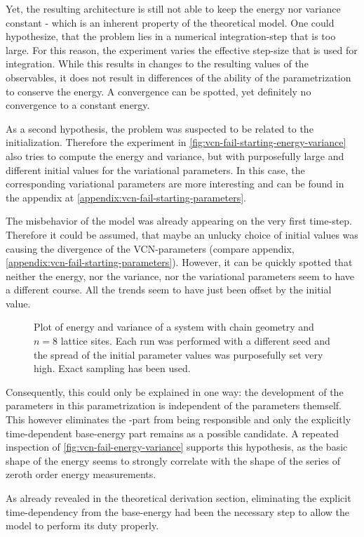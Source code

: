 Yet, the resulting architecture is still not able to keep the energy nor variance constant - which is an inherent property of the theoretical model.
One could hypothesize, that the problem lies in a numerical integration-step that is too large.
For this reason, the experiment varies the effective step-size that is used for integration.
While this results in changes to the resulting values of the observables, it does not result in differences of the ability of the parametrization to conserve the energy.
A convergence can be spotted, yet definitely no convergence to a constant energy.

As a second hypothesis, the problem was suspected to be related to the initialization. 
Therefore the experiment in \autoref{fig:vcn-fail-starting-energy-variance} also tries to compute the energy and variance, but with purposefully large and different initial values for the variational parameters.
In this case, the corresponding variational parameters are more interesting and can be found in the appendix at \ref{appendix:vcn-fail-starting-parameters}.

The misbehavior of the model was already appearing on the very first time-step.
Therefore it could be assumed, that maybe an unlucky choice of initial values was causing the divergence of the VCN-parameters (compare appendix, \ref{appendix:vcn-fail-starting-parameters}).
However, it can be quickly spotted that neither the energy, nor the variance, nor the variational parameters seem to have a different course.
All the trends seem to have just been offset by the initial value.

\begin{figure}[htbp]
    \centering
    \vspace{-0.2cm}
    \caption{
            Plot of energy and variance of a system with chain geometry and $n=8$ lattice sites.
            Each run was performed with a different seed and the spread of the initial parameter values was purposefully set very high.
            Exact sampling has been used.
        }
    \label{fig:vcn-fail-starting-energy-variance}
\end{figure}

Consequently, this could only be explained in one way: the development of the parameters in this parametrization is independent of the parameters themself.
This however eliminates the \HNOft[N]-part from being responsible and only the explicitly time-dependent base-energy part remains as a possible candidate.
A repeated inspection of \autoref{fig:vcn-fail-energy-variance} supports this hypothesis, as the basic shape of the energy seems to strongly correlate with the shape of the series of zeroth order energy measurements.

As already revealed in the theoretical derivation section, eliminating the explicit time-dependency from the base-energy had been the necessary step to allow the model to perform its duty properly.